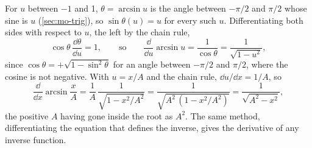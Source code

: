 \begin{toolbox}
For $u$ between $-1$ and 1, $\theta = \arcsin u$ is the angle between
$-\pi/2$ and $\pi/2$ whose sine is $u$ (\cref{sec:mo-trig}), so $\sin
\theta(u) = u$ for every such $u$. Differentiating both sides with respect
to $u$, the left by the chain rule,
\begin{equation*}
   \cos\theta\,\frac{\dd\theta}{\dd u} = 1 ,
   \qquad\text{so}\qquad
   \frac{\dd}{\dd u}\arcsin u = \frac{1}{\cos\theta}
   = \frac{1}{\sqrt{1 - u^2}} ,
\end{equation*}
since $\cos\theta = +\sqrt{1 - \sin^2\theta}$ for an angle between
$-\pi/2$ and $\pi/2$, where the cosine is not negative. With $u = x/A$ and
the chain rule, $\dd u/\dd x = 1/A$, so
\begin{equation*}
   \frac{\dd}{\dd x}\arcsin\frac{x}{A} = \frac{1}{A}\,
   \frac{1}{\sqrt{1 - x^2/A^2}} = \frac{1}{\sqrt{A^2\,(1 - x^2/A^2)}}
   = \frac{1}{\sqrt{A^2 - x^2}} ,
\end{equation*}
the positive $A$ having gone inside the root as $A^2$.
The same method, differentiating the equation that defines the inverse,
gives the derivative of any inverse function.
\end{toolbox}

